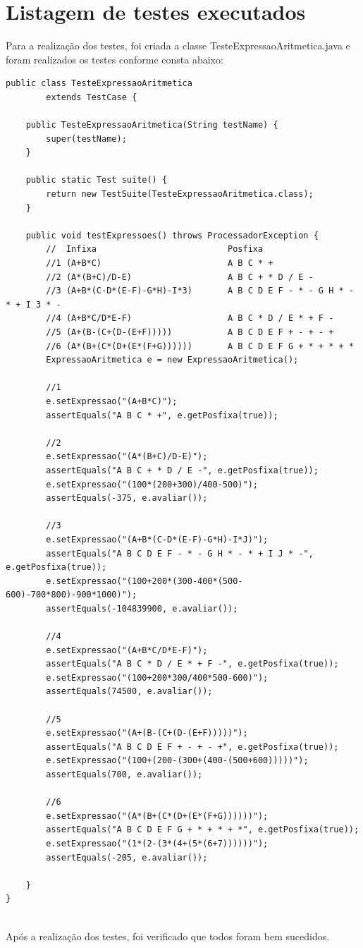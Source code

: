 \documentclass[a4paper,11pt]{article}
\begin{document}
\section{Listagem de testes executados}
Para a realização dos testes, foi criada a classe TesteExpressaoAritmetica.java e foram realizados os testes conforme consta abaixo:
\begin{lstlisting}
public class TesteExpressaoAritmetica
        extends TestCase {

    public TesteExpressaoAritmetica(String testName) {
        super(testName);
    }

    public static Test suite() {
        return new TestSuite(TesteExpressaoAritmetica.class);
    }

    public void testExpressoes() throws ProcessadorException {
        //  Infixa                          Posfixa
        //1 (A+B*C)                         A B C * +
        //2 (A*(B+C)/D-E)                   A B C + * D / E -
        //3 (A+B*(C-D*(E-F)-G*H)-I*3)       A B C D E F - * - G H * - * + I 3 * -
        //4 (A+B*C/D*E-F)                   A B C * D / E * + F -
        //5 (A+(B-(C+(D-(E+F)))))           A B C D E F + - + - +
        //6 (A*(B+(C*(D+(E*(F+G))))))       A B C D E F G + * + * + *
        ExpressaoAritmetica e = new ExpressaoAritmetica();
        
        //1
        e.setExpressao("(A+B*C)");
        assertEquals("A B C * +", e.getPosfixa(true));
        
        //2
        e.setExpressao("(A*(B+C)/D-E)");
        assertEquals("A B C + * D / E -", e.getPosfixa(true));
        e.setExpressao("(100*(200+300)/400-500)");
        assertEquals(-375, e.avaliar());
        
        //3
        e.setExpressao("(A+B*(C-D*(E-F)-G*H)-I*J)");
        assertEquals("A B C D E F - * - G H * - * + I J * -", e.getPosfixa(true));
        e.setExpressao("(100+200*(300-400*(500-600)-700*800)-900*1000)");
        assertEquals(-104839900, e.avaliar());
        
        //4
        e.setExpressao("(A+B*C/D*E-F)");
        assertEquals("A B C * D / E * + F -", e.getPosfixa(true));
        e.setExpressao("(100+200*300/400*500-600)");
        assertEquals(74500, e.avaliar());
        
        //5
        e.setExpressao("(A+(B-(C+(D-(E+F)))))");
        assertEquals("A B C D E F + - + - +", e.getPosfixa(true));
        e.setExpressao("(100+(200-(300+(400-(500+600)))))");
        assertEquals(700, e.avaliar());
        
        //6
        e.setExpressao("(A*(B+(C*(D+(E*(F+G))))))");
        assertEquals("A B C D E F G + * + * + *", e.getPosfixa(true));                
        e.setExpressao("(1*(2-(3*(4+(5*(6+7))))))");
        assertEquals(-205, e.avaliar());
        
    }
}


\end{lstlisting}
Após a realização dos testes, foi verificado que todos foram bem sucedidos. 
\end{document}
